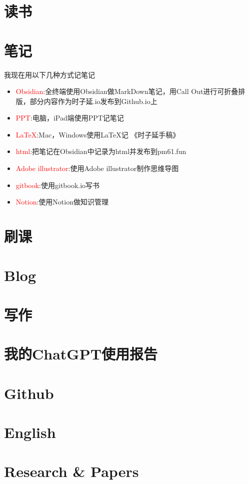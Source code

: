 \documentclass[lang=cn,newtx,10pt,color=green,scheme=chinese]{elegantbook}
\begin{document}
\section{读书}
\section{笔记}
我现在用以下几种方式记笔记
\begin{itemize}
    \item \textcolor{red}{Obsidian}:全终端使用Obsidian做MarkDown笔记，用Call Out进行可折叠排版，部分内容作为时子延.io发布到Github.io上
    \item \textcolor{red}{PPT}:电脑，iPad端使用PPT记笔记
    \item \textcolor{red}{\LaTeX{}}:Mac，Windows使用\LaTeX{}记 《时子延手稿》
    \item \textcolor{red}{html}:把笔记在Obsidian中记录为html并发布到pm61.fun
    \item \textcolor{red}{Adobe illustrator}:使用Adobe illustrator制作思维导图
    \item \textcolor{red}{gitbook}:使用gitbook.io写书
    \item \textcolor{red}{Notion}:使用Notion做知识管理
\end{itemize}
\section{刷课}
\section{Blog}
\section{写作}


\section{我的ChatGPT使用报告}
\section{Github}
\section{English}
\section{Research \& Papers}
\end{document}
